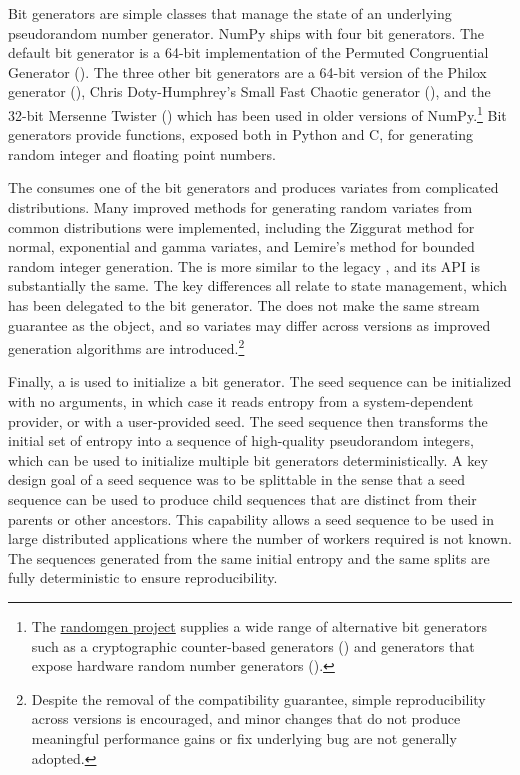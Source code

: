 Bit generators are simple classes that manage the state of an underlying
pseudorandom number generator. NumPy ships with four bit generators. The default
bit generator is a 64-bit implementation of the Permuted Congruential Generator
\cite{pcg64} (). The three other bit generators are a 64-bit version
of the Philox generator\cite{random123} (), Chris Doty-Humphrey's
Small Fast Chaotic generator\cite{practrand} (), and the 32-bit
Mersenne Twister\cite{mt19937} () which has been used in older
versions of NumPy.\footnote{The
\href{https://github.com/bashtage/randomgen}{randomgen project} supplies a wide
range of alternative bit generators such as a cryptographic counter-based
generators () and generators that expose hardware random number
generators ()\cite{randomgen}.} Bit generators provide
functions, exposed both in Python and C, for generating random integer
and floating point numbers.

The  consumes one of the bit generators and produces variates
from complicated distributions. Many improved methods for generating random
variates from common distributions were implemented, including the Ziggurat
method for normal, exponential and gamma variates\cite{ziggurat}, and Lemire's
method for bounded random integer generation\cite{lemire}. The 
is more similar to the legacy , and its API is substantially
the same. The key differences all relate to state management, which has been
delegated to the bit generator. The  does not make the same
stream guarantee as the  object, and so variates may differ
across versions as improved generation algorithms are
introduced.\footnote{Despite the removal of the compatibility guarantee, simple
reproducibility across versions is encouraged, and minor changes that do not
produce meaningful performance gains or fix underlying bug are not generally
adopted.}

Finally, a  is used to initialize a bit generator. The seed
sequence can be initialized with no arguments, in which case it reads entropy
from a system-dependent provider, or with a user-provided seed. The seed
sequence then transforms the initial set of entropy into a sequence of
high-quality pseudorandom integers, which can be used to initialize multiple bit
generators deterministically. A key design goal of a seed sequence was to be
splittable in the sense that a seed sequence can be used to produce child
sequences that are distinct from their parents or other ancestors. This
capability allows a seed sequence to be used in large distributed applications
where the number of workers required is not known. The sequences generated from
the same initial entropy and the same splits are fully deterministic to ensure
reproducibility.

